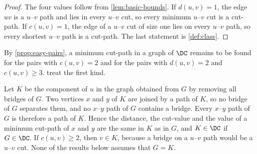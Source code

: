 \begin{proof}
The four values follow from \cref{lem:basic-bounds}.
If $d(u, v) = 1$, the edge $uv$ is a $u$--$v$ path and lies in every $u$--$v$ cut, so every minimum $u$--$v$ cut is a cut-path.
If $c(u, v) = 1$, the edge of a $u$--$v$ cut of size one lies on every $u$--$v$ path, so every shortest $u$--$v$ path is a cut-path.
The last statement is \cref{def:class}.
\end{proof}

By \cref{prop:easy-pairs}, a minimum cut-path in a graph of $\DC$ remains to be found for the pairs with $c(u, v) = 2$ and for the pairs with $d(u, v) = 2$ and $c(u, v) \geq 3$.
 treat the first kind.

\begin{remark}[Bridges]
\label{rem:bridges}
Let $K$ be the component of $u$ in the graph obtained from $G$ by removing all bridges of $G$.
Two vertices $x$ and $y$ of $K$ are joined by a path of $K$, so no bridge of $G$ separates them, and no $x$--$y$ path of $G$ contains a bridge.
Every $x$--$y$ path of $G$ is therefore a path of $K$.
Hence the distance, the cut-value and the value of a minimum cut-path of $x$ and $y$ are the same in $K$ as in $G$, and $K \in \DC$ if $G \in \DC$.
If $c(u, v) \geq 2$, then $v \in K$, because a bridge on a $u$--$v$ path would be a $u$--$v$ cut.
None of the results below assumes that $G = K$.
\end{remark}
